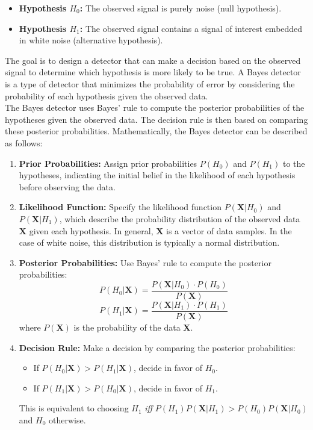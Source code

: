 \documentclass[12pt]{book}
\theoremstyle{definition}
\begin{document}
\begin{itemize}
    \item \textbf{Hypothesis \(H_0\):} The observed signal is purely noise (null hypothesis).
    \item \textbf{Hypothesis \(H_1\):} The observed signal contains a signal of interest embedded in white noise (alternative hypothesis).
\end{itemize}


The goal is to design a detector that can make a decision based on the observed signal to determine which hypothesis is more likely to be true. A Bayes detector is a type of detector that minimizes the probability of error by considering the probability of each hypothesis given the observed data.\\

The Bayes detector uses Bayes' rule to compute the posterior probabilities of the hypotheses given the observed data. The decision rule is then based on comparing these posterior probabilities. Mathematically, the Bayes detector can be described as follows:\\

\begin{enumerate}
    \item \textbf{Prior Probabilities:} Assign prior probabilities \(P(H_0)\) and \(P(H_1)\) to the hypotheses, indicating the initial belief in the likelihood of each hypothesis before observing the data.
    \item \textbf{Likelihood Function:} Specify the likelihood function \(P(\mathbf{X} | H_0)\) and \(P(\mathbf{X} | H_1)\), which describe the probability distribution of the observed data \(\mathbf{X}\) given each hypothesis. In general, \(\mathbf{X}\) is a vector of data samples. In the case of white noise, this distribution is typically a normal distribution.
    \item \textbf{Posterior Probabilities:} Use Bayes' rule to compute the posterior probabilities:
   \[ P(H_0 | \mathbf{X}) = \frac{P(\mathbf{X} | H_0) \cdot P(H_0)}{P(\mathbf{X})} \]
   \[ P(H_1 | \mathbf{X}) = \frac{P(\mathbf{X} | H_1) \cdot P(H_1)}{P(\mathbf{X})} \]
   where \(P(\mathbf{X})\) is the probability of the data \(\mathbf{X}\).
    \item \textbf{Decision Rule:} Make a decision by comparing the posterior probabilities:
   \begin{itemize}
       \item If \(P(H_0 | \mathbf{X}) > P(H_1 | \mathbf{X})\), decide in favor of \(H_0\).
       \item If \(P(H_1 | \mathbf{X}) > P(H_0 | \mathbf{X})\), decide in favor of \(H_1\).
      \end{itemize}
   This is equivalent to choosing \(H_1\) \emph{iff} \(P(H_1)P(\mathbf{X}|H_1) > P(H_0)P(\mathbf{X}|H_0)\) and \(H_0\) otherwise.

\end{enumerate}
\end{document}
